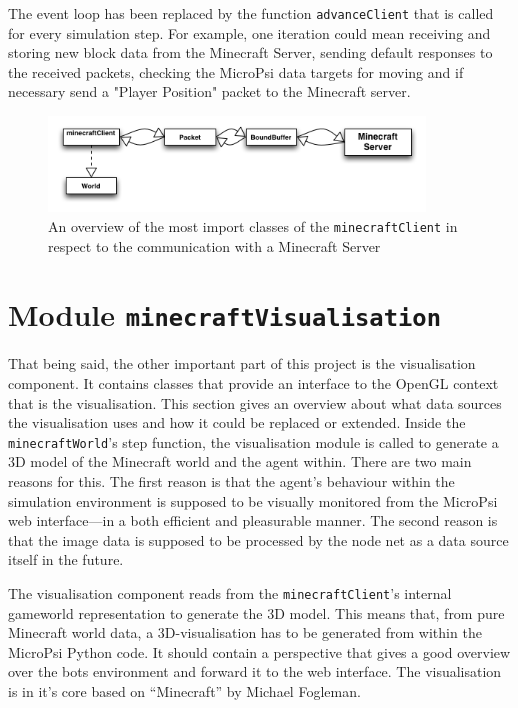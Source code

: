 The event loop has been replaced by the function \texttt{advanceClient} that is called for every simulation step. For example, one iteration could mean receiving and storing new block data from the Minecraft Server, sending default responses to the received packets, checking the MicroPsi data targets for moving and if necessary send a "Player Position" packet to the Minecraft server.

\begin{figure}[h]
  \centering
    \includegraphics[width=10cm]{graphics/spock_overview}
  \caption{An overview of the most import classes of the \texttt{minecraftClient} in respect to the communication with a Minecraft Server}
  \label{spock_overview}
\end{figure}

    \section{Module \texttt{minecraftVisualisation}}
That being said, the other important part of this project is the visualisation component. It contains classes that provide an interface to the OpenGL context that is the visualisation. This section gives an overview about what data sources the visualisation uses and how it could be replaced or extended. Inside the \texttt{minecraftWorld}'s step function, the visualisation module is called to generate a 3D model of the Minecraft world and the agent within. There are two main reasons for this. The first reason is that the agent's behaviour within the simulation environment is supposed to be visually monitored from the MicroPsi web interface---in a both efficient and pleasurable manner. The second reason is that the image data is supposed to be processed by the node net as a data source itself in the future.

The visualisation component reads from the \texttt{minecraftClient}'s internal gameworld representation to generate the 3D model. This means that, from pure Minecraft world data, a 3D-visualisation has to be generated from within the MicroPsi Python code. It should contain a perspective that gives a good overview over the bots environment and forward it to the web interface. The visualisation is in it's core based on ``Minecraft'' by Michael Fogleman.

